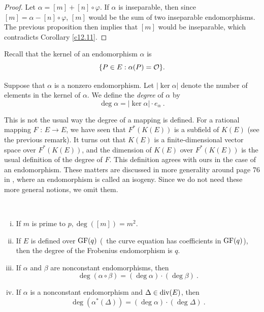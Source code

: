 \begin{proof}
Let $\alpha =[m]+[n]\circ\varphi$. If $\alpha$ is inseparable, then since $[m]=\alpha -[n]\circ\varphi$, $[m]$ would be the sum of two inseparable endomorphisms. The previous proposition then implies that $[m]$ would be inseparable, which contradicts Corollary \ref{c12.11}. 
\end{proof}

Recall that the kernel of an endomorphism $\alpha$ is 
\[\{P\in E:\alpha(P)=\mathcal{O}\}.\]

\begin{defi}
\label{l12.14}
Suppose that $\alpha$ is a nonzero endomorphism. Let $|\ker \alpha|$ denote the number of elements in the kernel of $\alpha$. We define the {\it degree} of $\alpha$ by
$$
\deg\alpha=|\ker \alpha|\cdot e_{\alpha}\ .
$$
\end{defi}

\rem
This is not the usual way the degree of a mapping is defined. For a rational mapping $F$ : $E\rightarrow E$, we have seen that $F^{*}(K(E))$ is a subfield of $K(E)$ (see the previous remark). It turns out that $K(E)$ is a finite-dimensional vector space over $F^{*}(K(E))$, and the dimension of $K(E)$ over $F^{*}(K(E))$ is the usual definition of the degree of $F$. This definition agrees with ours in the case of an endomorphism. These matters are discussed in more generality around page 76 in \cite{r1.6}, where an endomorphism is called an isogeny. Since we do not need these more general notions, we omit them.

\begin{exo}
\label{e12.15}
~
\begin{enumerate}[(i)]
\item
If $m$ is prime to $p,\deg([m])=m^{2}$.
\item
If $E$ is defined over $\operatorname{GF}(q)$ (\ie\ the curve equation has coefficients in $\operatorname{GF}(q)$), then the degree of the Frobenius endomorphism
is $q$.
\item
If $\alpha$ and $\beta$ are nonconstant endomorphisms, then
$$
\deg(\alpha\circ\beta)=(\deg\alpha)\cdot(\deg\beta)\ .
$$
\item
If $\alpha$ is a nonconstant endomorphism and $\Delta\in \operatorname{div}(E)$, then
$$
\deg(\alpha^{*}(\Delta))=(\deg\alpha)\cdot(\deg\Delta)\ .
$$
\end{enumerate}
\end{exo}

